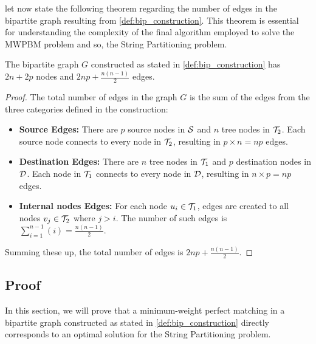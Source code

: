 let now state the following theorem regarding the number of edges in the bipartite graph resulting from \cref{def:bip_construction}. This theorem is essential for understanding the complexity of the final algorithm employed to solve the MWPBM problem and so, the String Partitioning problem.

\begin{theorem} \label{thm:bip_graph_properties}
    The bipartite graph $G$ constructed as stated in \cref{def:bip_construction} has $2n + 2p$ nodes and $2np + \frac{n(n-1)}{2}$ edges.
\end{theorem}

\begin{proof}
    The total number of edges in the graph $G$ is the sum of the edges from the three categories defined in the construction:
    \begin{itemize}[leftmargin=25pt]
        \item \textbf{Source Edges:} There are $p$ source nodes in $\mathcal{S}$ and $n$ tree nodes in $\mathcal{T}_{2}$. Each source node connects to every node in $\mathcal{T}_{2}$, resulting in $p \times n = np$ edges.

        \item \textbf{Destination Edges:} There are $n$ tree nodes in $\mathcal{T}_{1}$ and $p$ destination nodes in $\mathcal{D}$. Each node in $\mathcal{T}_{1}$ connects to every node in $\mathcal{D}$, resulting in $n \times p = np$ edges.

        \item \textbf{Internal nodes Edges:} For each node $u_i \in \mathcal{T}_{1}$, edges are created to all nodes $v_j \in \mathcal{T}_{2}$ where $j > i$. The number of such edges is $\sum_{i=1}^{n-1} (i) = \frac{n(n-1)}{2}$.
    \end{itemize}

    Summing these up, the total number of edges is $2np + \frac{n(n-1)}{2}$.
\end{proof}

\subsection{Proof}
In this section, we will prove that a minimum-weight perfect matching in a bipartite graph constructed as stated in \cref{def:bip_construction} directly corresponds to an optimal solution for the String Partitioning problem. 

